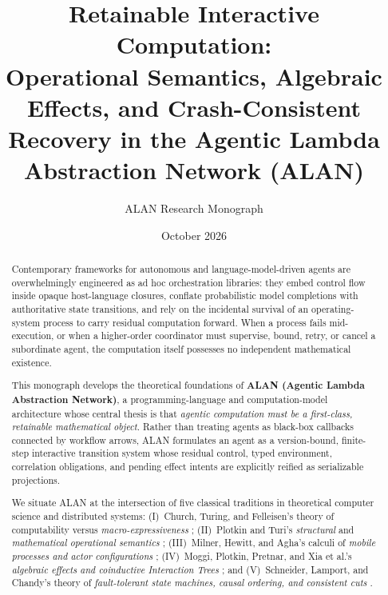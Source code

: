 \documentclass[11pt,a4paper]{article}
\title{\textbf{Retainable Interactive Computation:\\Operational Semantics, Algebraic Effects, and Crash-Consistent Recovery in the Agentic Lambda Abstraction Network (ALAN)}}
\author{ALAN Research Monograph}
\date{October 2026}
\theoremstyle{definition}
\theoremstyle{remark}
\begin{document}
\maketitle

\begin{abstract}
Contemporary frameworks for autonomous and language-model-driven agents are overwhelmingly engineered as ad hoc orchestration libraries: they embed control flow inside opaque host-language closures, conflate probabilistic model completions with authoritative state transitions, and rely on the incidental survival of an operating-system process to carry residual computation forward. When a process fails mid-execution, or when a higher-order coordinator must supervise, bound, retry, or cancel a subordinate agent, the computation itself possesses no independent mathematical existence.

This monograph develops the theoretical foundations of \textbf{ALAN (Agentic Lambda Abstraction Network)}, a programming-language and computation-model architecture whose central thesis is that \emph{agentic computation must be a first-class, retainable mathematical object}. Rather than treating agents as black-box callbacks connected by workflow arrows, ALAN formulates an agent as a version-bound, finite-step interactive transition system whose residual control, typed environment, correlation obligations, and pending effect intents are explicitly reified as serializable projections.

We situate ALAN at the intersection of five classical traditions in theoretical computer science and distributed systems: (I)~Church, Turing, and Felleisen's theory of computability versus \emph{macro-expressiveness} \cite{church1936unsolvable,turing1936computable,felleisen1991expressive}; (II)~Plotkin and Turi's \emph{structural} and \emph{mathematical operational semantics} \cite{plotkin1981structural,turi1997towards}; (III)~Milner, Hewitt, and Agha's calculi of \emph{mobile processes and actor configurations} \cite{hewitt1973universal,milner1992calculus,agha1997foundation}; (IV)~Moggi, Plotkin, Pretnar, and Xia et al.'s \emph{algebraic effects and coinductive Interaction Trees} \cite{moggi1991notions,plotkin2013handling,xia2020interaction}; and (V)~Schneider, Lamport, and Chandy's theory of \emph{fault-tolerant state machines, causal ordering, and consistent cuts} \cite{lamport1978time,chandy1985distributed,schneider1990implementing}.


\end{abstract}
\end{document}
